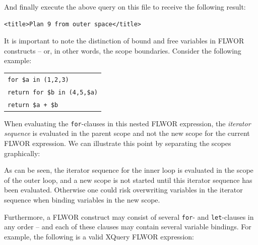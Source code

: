 And finally execute the above query on this file to receive the following
result:
\begin{center}
\begin{minipage}[h]{7.5cm}
\begin{verbatim}
<title>Plan 9 from outer space</title>
\end{verbatim}
\end{minipage}
\end{center}
It is important to note the distinction of bound and free variables in FLWOR
constructs -- or, in other words, the scope boundaries. Consider the following
example:
\begin{center}
\begin{tabular}{l}
\texttt{for \$a in (1,2,3)} \\ \quad
  \texttt{return for \$b in (4,5,\$a)}\\ \quad\quad
    \texttt{return \$a + \$b}
\end{tabular}
\end{center}

When evaluating the \texttt{for}-clauses in this nested FLWOR expression, the
\textit{iterator sequence} is evaluated in the parent scope and not the
new scope for the current FLWOR expression. We can illustrate this point by
separating the scopes graphically:
\begin{figure}
\centering
{}
\end{figure}

As can be seen, the iterator sequence for the inner loop is evaluated in the
scope of the outer loop, and a new scope is not started until this iterator
sequence has been evaluated. Otherwise one could risk overwriting variables in
the iterator sequence when binding variables in the new scope.

Furthermore, a FLWOR construct may consist of several \texttt{for}- and
\texttt{let}-clauses in any order -- and each of these clauses may contain
several variable bindings. For example, the following is a valid XQuery
FLWOR expression:

